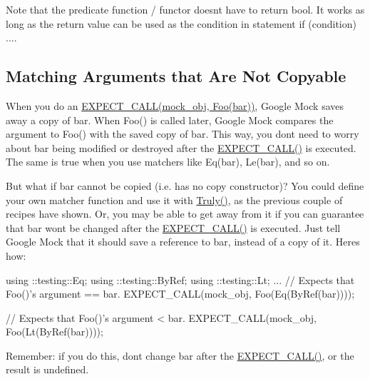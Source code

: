 Note that the predicate function / functor doesn\textquotesingle{}t have to return {\ttfamily bool}. It works as long as the return value can be used as the condition in statement {\ttfamily if (condition) ...}.

\subsection*{Matching Arguments that Are Not Copyable}

When you do an {\ttfamily \hyperlink{gmock-spec-builders_8h_a535a6156de72c1a2e25a127e38ee5232}{E\+X\+P\+E\+C\+T\+\_\+\+C\+A\+L\+L(mock\+\_\+obj, Foo(bar))}}, Google Mock saves away a copy of {\ttfamily bar}. When {\ttfamily Foo()} is called later, Google Mock compares the argument to {\ttfamily Foo()} with the saved copy of {\ttfamily bar}. This way, you don\textquotesingle{}t need to worry about {\ttfamily bar} being modified or destroyed after the {\ttfamily \hyperlink{gmock-spec-builders_8h_a535a6156de72c1a2e25a127e38ee5232}{E\+X\+P\+E\+C\+T\+\_\+\+C\+A\+L\+L()}} is executed. The same is true when you use matchers like {\ttfamily Eq(bar)}, {\ttfamily Le(bar)}, and so on.

But what if {\ttfamily bar} cannot be copied (i.\+e. has no copy constructor)? You could define your own matcher function and use it with {\ttfamily \hyperlink{namespacetesting_a5faf05cfaae6074439960048e478b1c8}{Truly()}}, as the previous couple of recipes have shown. Or, you may be able to get away from it if you can guarantee that {\ttfamily bar} won\textquotesingle{}t be changed after the {\ttfamily \hyperlink{gmock-spec-builders_8h_a535a6156de72c1a2e25a127e38ee5232}{E\+X\+P\+E\+C\+T\+\_\+\+C\+A\+L\+L()}} is executed. Just tell Google Mock that it should save a reference to {\ttfamily bar}, instead of a copy of it. Here\textquotesingle{}s how\+:


\begin{DoxyCode}
using ::testing::Eq;
using ::testing::ByRef;
using ::testing::Lt;
...
  // Expects that Foo()'s argument == bar.
  EXPECT\_CALL(mock\_obj, Foo(Eq(ByRef(bar))));

  // Expects that Foo()'s argument < bar.
  EXPECT\_CALL(mock\_obj, Foo(Lt(ByRef(bar))));
\end{DoxyCode}


Remember\+: if you do this, don\textquotesingle{}t change {\ttfamily bar} after the {\ttfamily \hyperlink{gmock-spec-builders_8h_a535a6156de72c1a2e25a127e38ee5232}{E\+X\+P\+E\+C\+T\+\_\+\+C\+A\+L\+L()}}, or the result is undefined.

